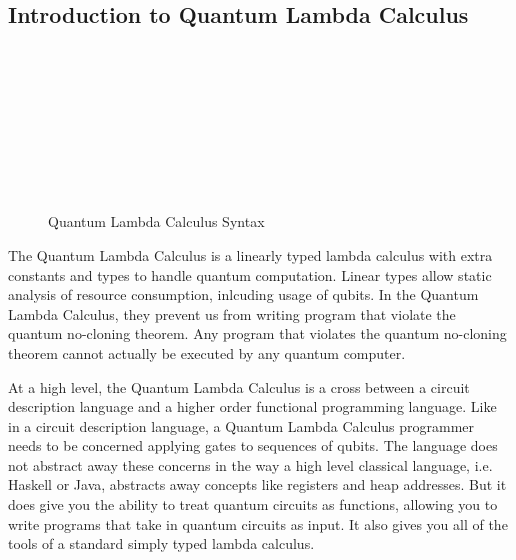 \subsection{Introduction to Quantum Lambda Calculus}
\begin{figure}[t]
    \begin{syntax}
            \\
            \alternative{!\tau}
            
            \\
            \\
            \\
            \\
            \\
            \\
    \end{syntax}
\caption{Quantum Lambda Calculus Syntax}
\label{fig:qcalc_syntax}
\end{figure}

The Quantum Lambda Calculus is a linearly typed lambda calculus with extra constants and types to handle quantum computation. 
Linear types allow static analysis of resource consumption, inlcuding usage of qubits.
In the Quantum Lambda Calculus, they prevent us from writing program that violate the quantum no-cloning theorem.
Any program that violates the quantum no-cloning theorem cannot actually be executed by any quantum computer.

At a high level, the Quantum Lambda Calculus is a cross between a circuit description language and a higher order functional programming language.
Like in a circuit description language, a Quantum Lambda Calculus programmer needs to be concerned applying gates to sequences of qubits.
The language does not abstract away these concerns in the way a high level classical language, i.e. Haskell or Java, abstracts away concepts like registers and heap addresses.
But it does give you the ability to treat quantum circuits as functions, allowing you to write programs that take in quantum circuits as input.
It also gives you all of the tools of a standard simply typed lambda calculus.

